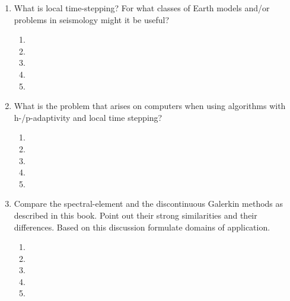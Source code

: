 \begin{enumerate}
\begin{enumerate}
\item[] 
\end{enumerate}
\item
What is local time-stepping? For what classes of Earth models and/or problems in seismology might it be useful?
\begin{enumerate}
\item[]
\item[]
\item[] 
\item[]
\item[] 
\end{enumerate}
\item
What is the problem that arises on computers when using algorithms with h-/p-adaptivity and local time stepping? 
\begin{enumerate}
\item[]
\item[]
\item[] 
\item[]
\item[] 
\end{enumerate}
\item
Compare the spectral-element and the discontinuous Galerkin methods as described in this book. Point out their strong similarities and their differences. Based on this discussion formulate domains of application.  
\begin{enumerate}
\item[]
\item[]
\item[] 
\item[]
\item[] 
\end{enumerate}
\end{enumerate}

